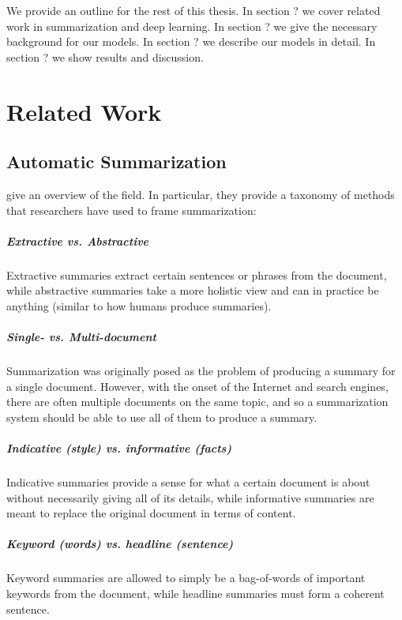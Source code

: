 \documentclass[11pt]{report}
\begin{document}
We provide an outline for the rest of this thesis.
In section ? we cover related work in summarization and deep learning.
In section ? we give the necessary background for our models.
In section ? we describe our models in detail.
In section ? we show results and discussion.




\chapter{Related Work}

\section{Automatic Summarization}

\citet{Nenkova2011} give an overview of the field. In particular, they provide a taxonomy of methods that researchers have used to frame summarization:

\paragraph{Extractive vs. Abstractive} Extractive summaries extract certain sentences or phrases from the document, while abstractive summaries take a more holistic view and can in practice be anything (similar to how humans produce summaries). 

\paragraph{Single- vs. Multi-document} Summarization was originally posed as the problem of producing a summary for a single document. However, with the onset of the Internet and search engines, there are often multiple documents on the same topic, and so a summarization system should be able to use all of them to produce a summary.

\paragraph{Indicative (style) vs. informative (facts)} Indicative summaries provide a sense for what a certain document is about without necessarily giving all of its details, while informative summaries are meant to replace the original document in terms of content.

\paragraph{Keyword (words) vs. headline (sentence)} Keyword summaries are allowed to simply be a bag-of-words of important keywords from the document, while headline summaries must form a coherent sentence.
\end{document}
